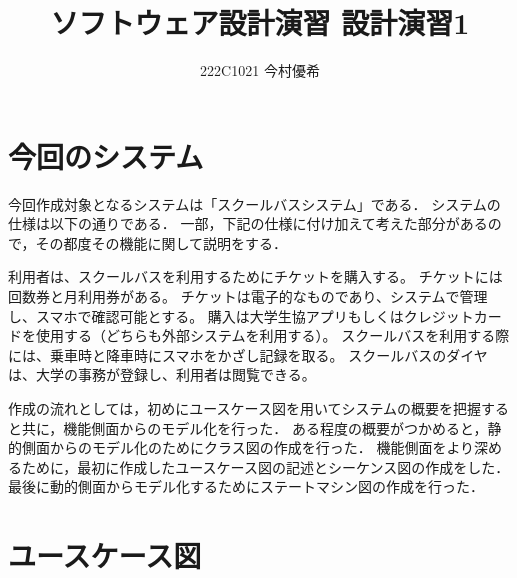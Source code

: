 \documentclass[documentclass]{jsarticle}
\begin{document}
\title{ソフトウェア設計演習 設計演習1}
\author{222C1021 今村優希}
\maketitle

\clearpage

\newpage

\section{今回のシステム}

今回作成対象となるシステムは「スクールバスシステム」である．
システムの仕様は以下の通りである．
一部，下記の仕様に付け加えて考えた部分があるので，その都度その機能に関して説明をする．

\begin{tcolorbox}
  利用者は、スクールバスを利用するためにチケットを購入する。
  チケットには回数券と月利用券がある。
  チケットは電子的なものであり、システムで管理し、スマホで確認可能とする。
  購入は大学生協アプリもしくはクレジットカードを使用する（どちらも外部システムを利用する）。
  スクールバスを利用する際には、乗車時と降車時にスマホをかざし記録を取る。
  スクールバスのダイヤは、大学の事務が登録し、利用者は閲覧できる。
\end{tcolorbox}

作成の流れとしては，初めにユースケース図を用いてシステムの概要を把握すると共に，機能側面からのモデル化を行った．
ある程度の概要がつかめると，静的側面からのモデル化のためにクラス図の作成を行った．
機能側面をより深めるために，最初に作成したユースケース図の記述とシーケンス図の作成をした．
最後に動的側面からモデル化するためにステートマシン図の作成を行った．

\newpage

\section{ユースケース図}
\end{document}
